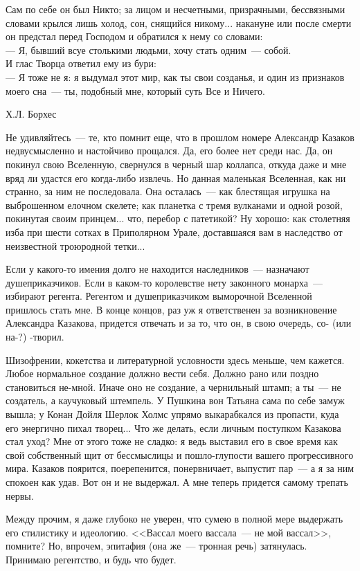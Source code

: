 \documentclass{scrbook}
\makeatletter
\newcommand{\bigepigraphwidth}{0.8} %
\newcommand{\defaultepigraphwidth}{0.5} %
\newcommand{\flqq}{<<}
\newcommand{\frqq}{>>}
\newcommand{\mdash}{~--- }
\newcommand{\sdash}{--- } %
\newcommand{\myepigraph}[3][\@empty]{
	\ifx\@empty#1
		\setlength{\epigraphwidth}{\defaultepigraphwidth\textwidth}
	\else
		\setlength{\epigraphwidth}{#1\textwidth}
	\fi
	\epigraph{#2}{#3}
	\setlength{\epigraphwidth}{\defaultepigraphwidth\textwidth} %
	\nopagebreak
}
\makeatother
\begin{document}
\myepigraph[\bigepigraphwidth]{Сам по себе он был Никто; за лицом и несчетными, призрачными, бессвязными словами крылся лишь холод, сон, снящийся никому... накануне или после смерти он предстал перед Господом и обратился к нему со словами: \\
{\sdash} Я, бывший всуе столькими людьми, хочу стать одним{\mdash}собой. \\
И глас Творца ответил ему из бури: \\
{\sdash} Я тоже не я: я выдумал этот мир, как ты свои созданья, и один из признаков моего сна{\mdash}ты, подобный мне, который суть Все и Ничего.}
{Х.Л. Борхес}

Не удивляйтесь{\mdash}те, кто помнит еще, что в прошлом номере Александр Казаков недвусмысленно и настойчиво прощался. Да, его более нет среди нас. Да, он покинул свою Вселенную, свернулся в черный шар коллапса, откуда даже и мне вряд ли удастся его когда-либо извлечь. Но данная маленькая Вселенная, как ни странно, за ним не последовала. Она осталась{\mdash}как блестящая игрушка на выброшенном елочном скелете; как планетка с тремя вулканами и одной розой, покинутая своим принцем... что, перебор с патетикой? Ну хорошо: как столетняя изба при шести сотках в Приполярном Урале, доставшаяся вам в наследство от неизвестной троюродной тетки...

Если у какого-то имения долго не находится наследников{\mdash}назначают душеприказчиков. Если в каком-то королевстве нету законного монарха{\mdash}избирают регента. Регентом и душеприказчиком выморочной Вселенной пришлось стать мне. В конце концов, раз уж я ответственен за возникновение Александра Казакова, придется отвечать и за то, что он, в свою очередь, со- (или на-?) -творил.

Шизофрении, кокетства и литературной условности здесь меньше, чем кажется. Любое нормальное создание должно вести себя. Должно рано или поздно становиться не-мной. Иначе оно не создание, а чернильный штамп; а ты{\mdash}не создатель, а каучуковый штемпель. У Пушкина вон Татьяна сама по себе замуж вышла; у Конан Дойля Шерлок Холмс упрямо выкарабкался из пропасти, куда его энергично пихал творец... Что же делать, если личным поступком Казакова стал уход? Мне от этого тоже не сладко: я ведь выставил его в свое время как свой собственный щит от бессмыслицы и пошло-глупости вашего прогрессивного мира. Казаков поярится, поерепенится, понервничает, выпустит пар{\mdash}а я за ним спокоен как удав. Вот он и не выдержал. А мне теперь придется самому трепать нервы.

Между прочим, я даже глубоко не уверен, что сумею в полной мере выдержать его стилистику и идеологию. {\flqq}Вассал моего вассала{\mdash}не мой вассал{\frqq}, помните? Но, впрочем, эпитафия (она же{\mdash}тронная речь) затянулась. Принимаю регентство, и будь что будет.
\end{document}
